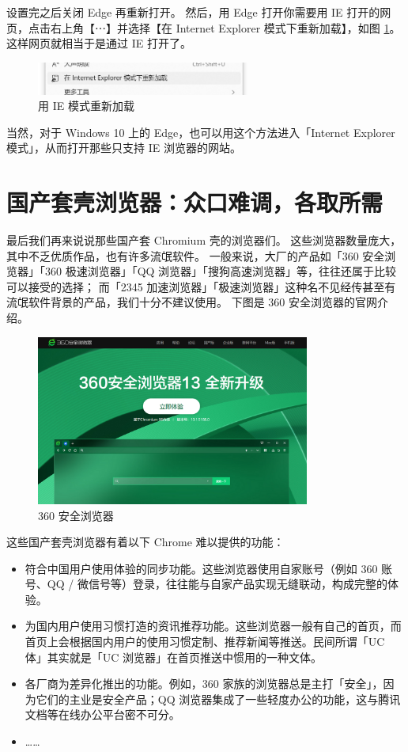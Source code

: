 设置完之后关闭 Edge 再重新打开。
然后，用 Edge 打开你需要用 IE 打开的网页，点击右上角【⋯】并选择【在 Internet Explorer 模式下重新加载】，如图 \ref{Reload_in_IE_Mode}。
这样网页就相当于是通过 IE 打开了。

\begin{figure}[htb!]
  \centering
  \includegraphics[width=7cm]{assets/Reload_in_IE_Mode.png}
  \caption{用 IE 模式重新加载}
  \label{Reload_in_IE_Mode}
\end{figure}

当然，对于 Windows 10 上的 Edge，也可以用这个方法进入「Internet Explorer 模式」，从而打开那些只支持 IE 浏览器的网站。

\section{国产套壳浏览器：众口难调，各取所需}

最后我们再来说说那些国产套 Chromium 壳的浏览器们。
这些浏览器数量庞大，其中不乏优质作品，也有许多流氓软件。
一般来说，大厂的产品如「360 安全浏览器」「360 极速浏览器」「QQ 浏览器」「搜狗高速浏览器」等，往往还属于比较可以接受的选择；
而「2345 加速浏览器」「极速浏览器」这种名不见经传甚至有流氓软件背景的产品，我们十分不建议使用。
下图是 360 安全浏览器的官网介绍。

\begin{figure}[htb!]
  \centering
  \includegraphics[width=9cm]{assets/360_se.png}
  \caption{360 安全浏览器}
  \label{360_se}
\end{figure}

这些国产套壳浏览器有着以下 Chrome 难以提供的功能：

\begin{itemize}
  \item 符合中国用户使用体验的同步功能。这些浏览器使用自家账号（例如 360 账号、QQ / 微信号等）登录，往往能与自家产品实现无缝联动，构成完整的体验。
  \item 为国内用户使用习惯打造的资讯推荐功能。这些浏览器一般有自己的首页，而首页上会根据国内用户的使用习惯定制、推荐新闻等推送。民间所谓「UC 体」其实就是「UC 浏览器」在首页推送中惯用的一种文体。
  \item 各厂商为差异化推出的功能。例如，360 家族的浏览器总是主打「安全」，因为它们的主业是安全产品；QQ 浏览器集成了一些轻度办公的功能，这与腾讯文档等在线办公平台密不可分。
  \item ……
\end{itemize}

